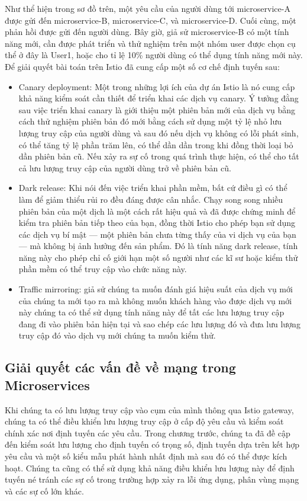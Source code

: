 \documentclass[12pt,a4paper]{report}
\begin{document}
			Như thể hiện trong sơ đồ trên, một yêu cầu của người dùng tới microservice-A được gửi đến microservice-B, microservice-C, và microservice-D. Cuối cùng, một phản hồi được gửi đến người dùng. Bây giờ, giả sử microservice-B có một tính năng mới, cần được phát triển và thử nghiệm trên một nhóm user được chọn cụ thể ở đây là User1, hoặc cho tỉ lệ 10\% người dùng có thể dụng tính năng mới này. 
			Để giải quyết bài toán trên Istio đã cung cấp một số cơ chế định tuyến sau:
			\begin{itemize}
				\item Canary deployment: Một trong những lợi ích của dự án Istio là nó cung cấp khả năng kiểm soát cần thiết để triển khai các dịch vụ canary. Ý tưởng đằng sau việc triển khai canary là giới thiệu một phiên bản mới của dịch vụ bằng cách thử nghiệm phiên bản đó mới bằng cách sử dụng một tỷ lệ nhỏ lưu lượng truy cập của người dùng và sau đó nếu dịch vụ không có lỗi phát sinh, có thể tăng tỷ lệ phần trăm lên, có thể dần dần trong khi đồng thời loại bỏ dần phiên bản cũ. Nếu xảy ra sự cố trong quá trình thực hiện, có thể cho tất cả lưu lượng truy cập của người dùng trở về phiên bản cũ.
				\item Dark release: Khi nói đến việc triển khai phần mềm, bất cứ điều gì có thể làm để giảm thiểu rủi ro đều đáng được cân nhắc. Chạy song song nhiều phiên bản của một dịch là một cách rất hiệu quả và đã được chứng minh để kiểm tra phiên bản tiếp theo của bạn, đồng thời Istio cho phép bạn sử dụng các dịch vụ bí mật — một phiên bản chưa từng thấy của vi dịch vụ của bạn — mà không bị ảnh hưởng đến sản phẩm. Đó là tính năng dark release, tính năng này cho phép chỉ cố giới hạn một số người như các kĩ sư hoặc kiểm thử phần mềm có thể truy cập vào chức năng này.
				\item Traffic mirroring: giả sử chúng ta muốn đánh giá hiệu suất của dịch vụ mới của chúng ta mới tạo ra mà không muốn khách hàng vào được dịch vụ mới này chúng ta có thể sử dụng tính năng này để tất các lưu lượng truy cập đang đi vào phiên bản hiện tại và sao chép các lưu lượng đó và đưa lưu lượng truy cập đó vào dịch vụ mới chúng ta muốn kiểm thử.
			\end{itemize}
			
			
		\subsection{Giải quyết các vấn đề về mạng trong Microservices}
\hspace{0.6cm}Khi chúng ta có lưu lượng truy cập vào cụm của mình thông qua Istio gateway, chúng ta có thể điều khiển lưu lượng truy cập ở cấp độ yêu cầu và kiểm soát chính xác nơi định tuyến các yêu cầu. Trong chương trước, chúng ta đã đề cập đến kiểm soát lưu lượng cho định tuyến có trọng số, định tuyến dựa trên kết hợp yêu cầu và một số kiểu mẫu phát hành nhất định mà sau đó có thể được kích hoạt. Chúng ta cũng có thể sử dụng khả năng điều khiển lưu lượng này để định tuyến né tránh các sự cố trong trường hợp xảy ra lỗi ứng dụng, phân vùng mạng và các sự cố lớn khác.
\end{document}
